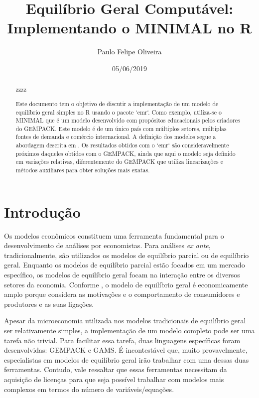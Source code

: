 \documentclass[12pt,twoside]{article}
\title{Equilíbrio Geral Computável: Implementando o MINIMAL no R}
\author{Paulo Felipe Oliveira}
\affil{\faGithub~paulofelipe}
\date{05/06/2019}
\date{}
\begin{document}
\maketitle

\begin{abstract}

zzzz

\noindent Este documento tem o objetivo de discutir a implementação de um modelo de equilíbrio geral simples no R usando o pacote `emr`. Como exemplo, utiliza-se o MINIMAL que é um modelo desenvolvido com propósitos educacionais pelos criadores do GEMPACK. Este modelo é de um único país com múltiplos setores, múltiplas fontes de demanda e comércio internacional. A definição dos modelos segue a abordagem descrita em \cite{zhang_2013}. Os resultados obtidos com o `emr` são consideravelmente próximos daqueles obtidos com o GEMPACK, ainda que aqui o modelo seja definido em variações relativas, diferentemente do GEMPACK que utiliza linearizações e métodos auxiliares para obter soluções mais exatas.
\end{abstract}

\hypertarget{introduuxe7uxe3o}{%
\section{Introdução}\label{introduuxe7uxe3o}}

Os modelos econômicos constituem uma ferramenta fundamental para o
desenvolvimento de análises por economistas. Para análises \emph{ex
ante}, tradicionalmente, são utilizados os modelos de equilíbrio parcial
ou de equilíbrio geral. Enquanto os modelos de equilíbrio parcial estão
focados em um mercado específico, os modelos de equilíbrio geral focam
na interação entre os diversos setores da economia. Conforme
\cite{burfisher2017}, o modelo de equilíbrio geral é economicamente
amplo porque considera as motivações e o comportamento de consumidores e
produtores e as suas ligações.

Apesar da microeconomia utilizada nos modelos tradicionais de equilíbrio
geral ser relativamente simples, a implementação de um modelo completo
pode ser uma tarefa não trivial. Para facilitar essa tarefa, duas
linguagens específicas foram desenvolvidas: GEMPACK e GAMS. É
incontestável que, muito provavelmente, especialistas em modelos de
equilíbrio geral irão trabalhar com uma dessas duas ferramentas.
Contudo, vale ressaltar que essas ferramentas necessitam da aquisição de
licenças para que seja possível trabalhar com modelos mais complexos em
termos do número de variáveis/equações.
\end{document}
